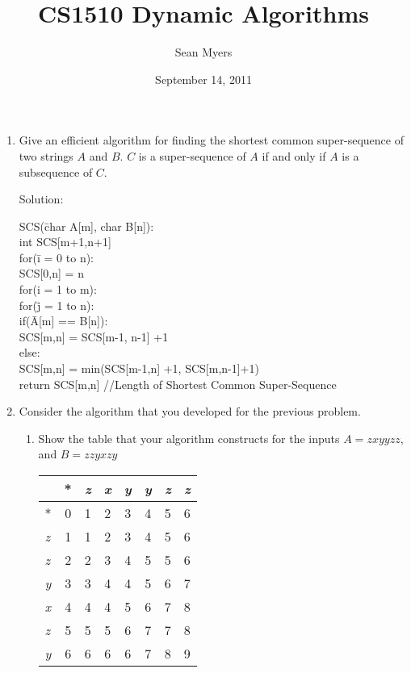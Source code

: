 \documentclass{article}
\title{CS1510 Dynamic Algorithms}
\author{Sean Myers}
\date{September 14, 2011}
\begin{document}
\maketitle

\begin{enumerate}
\item Give an efficient algorithm for finding the shortest common super-sequence of two strings $A$ and $B$. $C$ 
\newline is a super-sequence of $A$ if and only if $A$ is a subsequence of $C$.

Solution:
\begin{tabbing}
SCS(\= char A[m], char B[n]):\\
\>int SCS[m+1,n+1]\\
\>for(\=i = 0 to n):\\
\>\>SCS[0,n] = n\\
\>for(i = 1 to m):\\
\>\>for(\=j = 1 to n):\\
\>\>\>if(\=A[m] == B[n]):\\
\>\>\>\>SCS[m,n] = SCS[m-1, n-1] +1\\
\>\>\>else:\\
\>\>\>\>SCS[m,n] = min(SCS[m-1,n] +1, SCS[m,n-1]+1)\\
\>return SCS[m,n] //Length of Shortest Common Super-Sequence
\end{tabbing}

\item Consider the algorithm that you developed for the previous problem.
\newline
\begin{enumerate}
\item Show the table that your algorithm constructs for the inputs $A = zxyyzz$, and $B = zzyxzy$

\begin{tabular}{| l | c | c | c | c | c | c | r | }
\hline
   	& * & \textit{z} & \textit{x} & \textit{y} & \textit{y} & \textit{z} & \textit{z} \\ \hline
  * 	   & 0 & 1 & 2 & 3 & 4 & 5 & 6 \\ \hline
\textit{z} & 1 & 1 & 2 & 3 & 4 & 5 & 6 \\ \hline
\textit{z} & 2 & 2 & 3 & 4 & 5 & 5 & 6 \\ \hline
\textit{y} & 3 & 3 & 4 & 4 & 5 & 6 & 7 \\ \hline
\textit{x} & 4 & 4 & 4 & 5 & 6 & 7 & 8 \\ \hline
\textit{z} & 5 & 5 & 5 & 6 & 7 & 7 & 8 \\ \hline
\textit{y} & 6 & 6 & 6 & 6 & 7 & 8 & 9 \\ \hline
\end{tabular}



\end{enumerate}
\end{enumerate}
\end{document}
